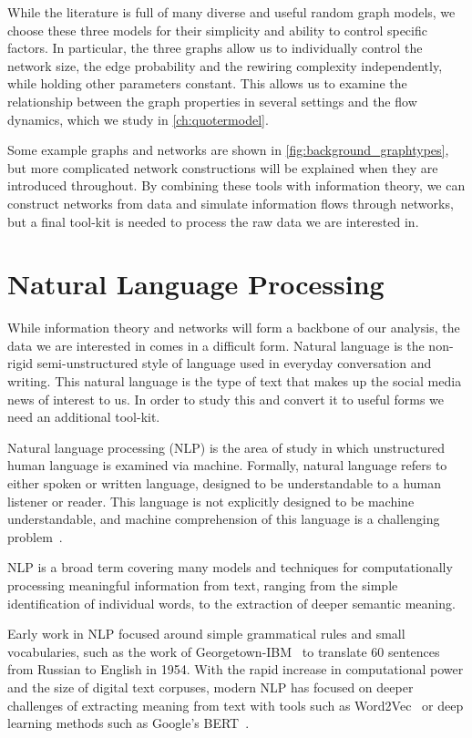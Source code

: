While the literature is full of many diverse and useful random graph models, we choose these three models for their simplicity and ability to control specific factors. In particular, the three graphs allow us to individually control the network size, the edge probability and the rewiring complexity independently, while holding other parameters constant. This allows us to examine the relationship between the graph properties in several settings and the flow dynamics, which we study in \autoref{ch:quotermodel}.

Some example graphs and networks are shown in \autoref{fig:background_graphtypes}, but more complicated network constructions will be explained when they are introduced throughout. By combining these tools with information theory, we can construct networks from data and simulate information flows through networks, but a final tool-kit is needed to process the raw data we are interested in.


\section{Natural Language Processing}

While information theory and networks will form a backbone of our analysis, the data we are interested in comes in a difficult form. Natural language is the non-rigid semi-unstructured style of language used in everyday conversation and writing. This natural language is the type of text that makes up the social media news of interest to us. In order to study this and convert it to useful forms we need an additional tool-kit.

Natural language processing (NLP) is the area of study in which unstructured human language is examined via machine. Formally, natural language refers to either spoken or written language, designed to be understandable to a human listener or reader. This language is not explicitly designed to be machine understandable, and machine comprehension of this language is a challenging problem~\cite{baeza-yates_challenges_2004}.

NLP is a broad term covering many models and techniques for computationally processing meaningful information from text, ranging from the simple identification of individual words, to the extraction of deeper semantic meaning. 

Early work in NLP focused around simple grammatical rules and small vocabularies, such as the work of Georgetown-IBM~\cite{hutchins_first_1997} to translate 60 sentences from Russian to English in 1954. With the rapid increase in computational power and the size of digital text corpuses, modern NLP has focused on deeper challenges of extracting meaning from text with tools such as Word2Vec~\cite{mikolov_distributed_2013, mikolov_efficient_2013} or deep learning methods such as Google's BERT~\cite{devlin_bert_2019}.

